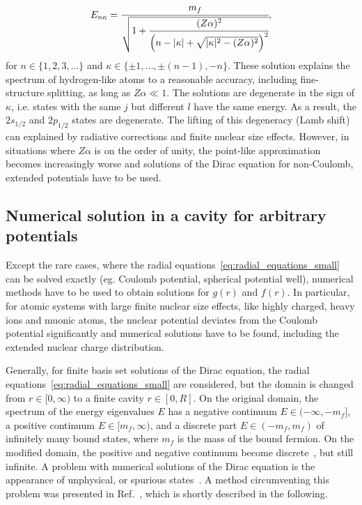\begin{equation}
\label{eq:finestructure_formula}
E_{n\kappa}=\cfrac{m_f}{\sqrt{1+\cfrac{(Z\alpha)^2}{\left( n-|\kappa|+\sqrt{|\kappa|^2-(Z\alpha)^2} \right)^2}}},
\end{equation}
for $n\in \{1,2,3,...\}$ and $\kappa \in \{\pm 1,...,\pm(n-1),-n\}$.
These solution explains the spectrum of hydrogen-like atoms to a reasonable accuracy, including fine-structure splitting, as long as $Z\alpha\ll 1$. The solutions are degenerate in the sign of $\kappa$, i.e. states with the same $j$ but different $l$ have the same energy. As a result, the $2s_{1/2}$ and $2p_{1/2}$ states are degenerate. The lifting of this degeneracy (Lamb shift) can explained by radiative corrections and finite nuclear size effects. However, in situations where $Z\alpha$ is on the order of unity, the point-like approximation becomes increasingly worse and solutions of the Dirac equation for non-Coulomb, extended potentials have to be used.



\subsection{Numerical solution in a cavity for arbitrary potentials}
Except the rare cases, where the radial equations~\eqref{eq:radial_equations_small} can be solved exactly (eg. Coulomb potential, spherical potential well), numerical methods have to be used to obtain solutions for $g(r)$ and $f(r)$. In particular, for atomic systems with large finite nuclear size effects, like highly charged, heavy ions and muonic atoms, the nuclear potential deviates from the Coulomb potential significantly and numerical solutions have to be found, including the extended nuclear charge distribution.
 
Generally, for finite basis set solutions of the Dirac equation, the radial equations~\eqref{eq:radial_equations_small} are considered, but the domain is changed from $r\in[0,\infty)$ to a finite cavity $r\in [0,R]$. On the original domain, the spectrum of the energy eigenvalues $E$ has a negative continuum $E\in (-\infty,-m_f]$, a positive continuum $E\in [m_f,\infty)$, and a discrete part $E\in (-m_f,m_f)$ of infinitely many bound states, where $m_f$ is the mass of the bound fermion. On the modified domain, the positive and negative continuum become discrete~\cite{johnson1988}, but still infinite.
A problem with numerical solutions of the Dirac equation is the appearance of unphysical, or spurious states~\cite{johnson1988, drake1981}. A method circumventing this problem was presented in Ref.~\cite{Shabaev2004}, which is shortly described in the following.


